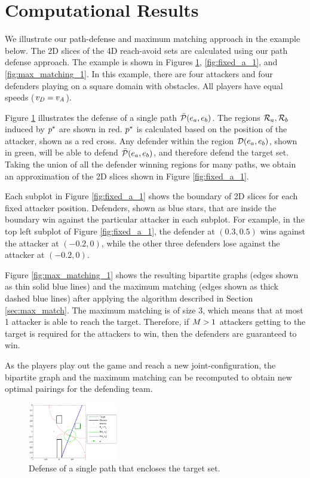 \section{Computational Results}
\label{sec:results}
We illustrate our path-defense and maximum matching approach in the example below. The 2D slices of the 4D reach-avoid sets are calculated using our path defense approach. The example is shown in Figures \ref{fig:pd_ex}, \ref{fig:fixed_a_1}, and \ref{fig:max_matching_1}. In this example, there are four attackers and four defenders playing on a square domain with obstacles. All players have equal speeds ($v_D=v_A$). 

Figure \ref{fig:pd_ex} illustrates the defense of a single path $\bar{\mathcal{P}}(e_a,e_b)$. The regions $\mathcal{R}_a,\mathcal{R}_b$ induced by $p^*$ are shown in red. $p^*$ is calculated based on the position of the attacker, shown as a red cross. Any defender within the region $\mathcal{D}(e_a,e_b)$, shown in green, will be able to defend $\bar{\mathcal{P}}(e_a,e_b)$, and therefore defend the target set. Taking the union of all the defender winning regions for many paths, we obtain an approximation of the 2D slices shown in Figure \ref{fig:fixed_a_1}.

Each subplot in Figure \ref{fig:fixed_a_1} shows the boundary of 2D slices for each fixed attacker position. Defenders, shown as blue stars, that are inside the boundary win against the particular attacker in each subplot. For example, in the top left subplot of Figure \ref{fig:fixed_a_1}, the defender at $(0.3, 0.5)$ wins against the attacker at $(-0.2, 0)$, while the other three defenders lose against the attacker at $(-0.2, 0)$.

Figure \ref{fig:max_matching_1} shows the resulting bipartite graphs (edges shown as thin solid blue lines) and the maximum matching (edges shown as thick dashed blue lines) after applying the algorithm described in Section \ref{sec:max_match}. The maximum matching is of size 3, which means that at most 1 attacker is able to reach the target. Therefore, if $M>1$ attackers getting to the target is required for the attackers to win, then the defenders are guaranteed to win. 

As the players play out the game and reach a new joint-configuration, the bipartite graph and the maximum matching can be recomputed to obtain new optimal pairings for the defending team.

\begin{figure}[H]
	\centering
	\includegraphics[width=0.35\textwidth]{"fig/PD example"}
	\caption{Defense of a single path that encloses the target set.}
	\label{fig:pd_ex}
\end{figure}

